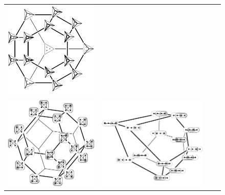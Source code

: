 \documentclass{amsart}
\theoremstyle{definition}
\begin{document}
\begin{figure}[t]
\begin{adjustbox}{center}
\begin{tabular}{c@{\;}c@{\;}c@{\;}c}
			\includegraphics[scale=.6]{stellohedron} \\
			\includegraphics[scale=.6]{permutahedronTubings} &
			\includegraphics[scale=.6]{associahedronTubings} &

\end{tabular}
\end{adjustbox}
\end{figure}
\end{document}
